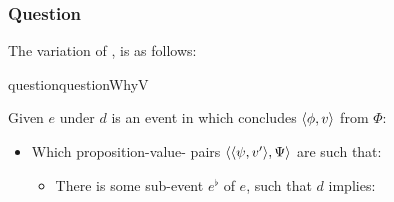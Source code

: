\subsubsection{Question}
\label{cha:var:sec:vars:qwhyvnp:question}

\begin{note}
  The variation of \qWhy{}, \qWhyV{} is as follows:

  \begin{restatable}[\qWhyV{}]{question}{questionWhyV}
    \label{q:why:v}
    \medskip

    Given \(e\) under \(d\) is an event in which \vAgent{} concludes \(\langle \phi, v \rangle\) from \(\Phi\):

    \begin{itemize}
    \item
      Which proposition-value-\pool{} pairs \(\langle \langle \psi, v' \rangle, \Psi \rangle\) are such that:
      \begin{itemize}
      \item
        There is some sub-event \(e^{\flat}\) of \(e\), such that \(d\) implies:


\end{itemize}
\end{itemize}
\end{restatable}
\end{note}
